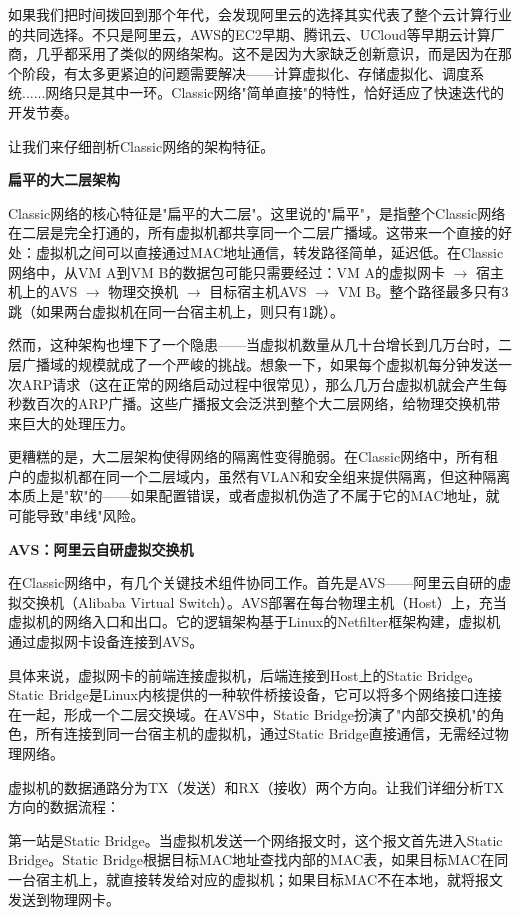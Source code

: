 如果我们把时间拨回到那个年代，会发现阿里云的选择其实代表了整个云计算行业的共同选择。不只是阿里云，AWS的EC2早期、腾讯云、UCloud等早期云计算厂商，几乎都采用了类似的网络架构。这不是因为大家缺乏创新意识，而是因为在那个阶段，有太多更紧迫的问题需要解决——计算虚拟化、存储虚拟化、调度系统......网络只是其中一环。Classic网络"简单直接"的特性，恰好适应了快速迭代的开发节奏。

让我们来仔细剖析Classic网络的架构特征。

\textbf{扁平的大二层架构}

Classic网络的核心特征是"扁平的大二层"。这里说的"扁平"，是指整个Classic网络在二层是完全打通的，所有虚拟机都共享同一个二层广播域。这带来一个直接的好处：虚拟机之间可以直接通过MAC地址通信，转发路径简单，延迟低。在Classic网络中，从VM A到VM B的数据包可能只需要经过：VM A的虚拟网卡 $\rightarrow$ 宿主机上的AVS $\rightarrow$ 物理交换机 $\rightarrow$ 目标宿主机AVS $\rightarrow$ VM B。整个路径最多只有3跳（如果两台虚拟机在同一台宿主机上，则只有1跳）。

然而，这种架构也埋下了一个隐患——当虚拟机数量从几十台增长到几万台时，二层广播域的规模就成了一个严峻的挑战。想象一下，如果每个虚拟机每分钟发送一次ARP请求（这在正常的网络启动过程中很常见），那么几万台虚拟机就会产生每秒数百次的ARP广播。这些广播报文会泛洪到整个大二层网络，给物理交换机带来巨大的处理压力。

更糟糕的是，大二层架构使得网络的隔离性变得脆弱。在Classic网络中，所有租户的虚拟机都在同一个二层域内，虽然有VLAN和安全组来提供隔离，但这种隔离本质上是"软"的——如果配置错误，或者虚拟机伪造了不属于它的MAC地址，就可能导致"串线"风险。

\textbf{AVS：阿里云自研虚拟交换机}

在Classic网络中，有几个关键技术组件协同工作。首先是AVS——阿里云自研的虚拟交换机（Alibaba Virtual Switch）。AVS部署在每台物理主机（Host）上，充当虚拟机的网络入口和出口。它的逻辑架构基于Linux的Netfilter框架构建，虚拟机通过虚拟网卡设备连接到AVS。

具体来说，虚拟网卡的前端连接虚拟机，后端连接到Host上的Static Bridge。Static Bridge是Linux内核提供的一种软件桥接设备，它可以将多个网络接口连接在一起，形成一个二层交换域。在AVS中，Static Bridge扮演了"内部交换机"的角色，所有连接到同一台宿主机的虚拟机，通过Static Bridge直接通信，无需经过物理网络。

虚拟机的数据通路分为TX（发送）和RX（接收）两个方向。让我们详细分析TX方向的数据流程：

第一站是Static Bridge。当虚拟机发送一个网络报文时，这个报文首先进入Static Bridge。Static Bridge根据目标MAC地址查找内部的MAC表，如果目标MAC在同一台宿主机上，就直接转发给对应的虚拟机；如果目标MAC不在本地，就将报文发送到物理网卡。


